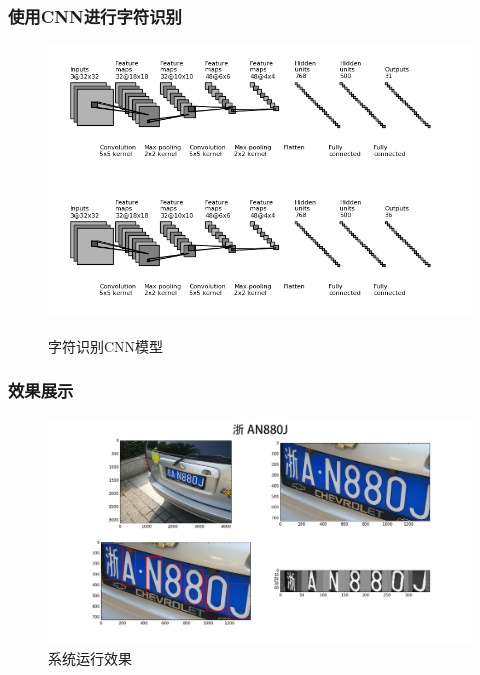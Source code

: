 \documentclass[UTF8]{beamer}
\begin{document}
\begin{frame}
  \frametitle{使用CNN进行字符识别}

  \begin{figure}[ht]
    \centering
    {\includegraphics[height=0.25\textheight, keepaspectratio]{./Figure/RecognitionChinese.png}}
    {\includegraphics[height=0.25\textheight, keepaspectratio]{./Figure/RecognitionAlnum.png}}
    \caption{字符识别CNN模型} \label{Fig:RecognitionCNN}
  \end{figure}
\end{frame}

\begin{frame}
  \frametitle{效果展示}

  \begin{figure}[ht]
    \centering
    \includegraphics[width=1.0\linewidth]{./Figure/End2EndDemo2.png}
    \caption{系统运行效果}\label{Fig:End2EndDemo}
  \end{figure}
\end{frame}
\end{document}
